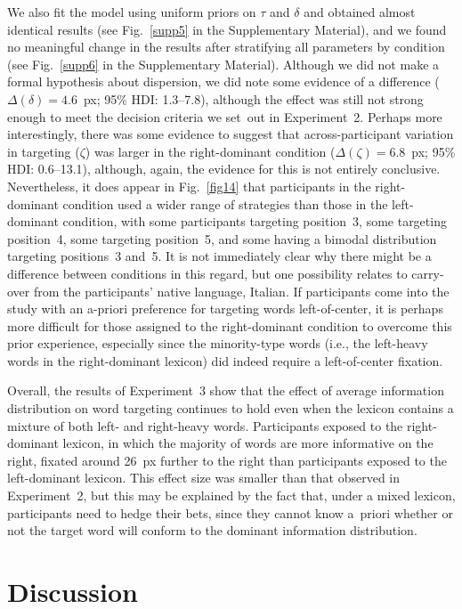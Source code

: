 \documentclass[doc,biblatex,floatsintext]{apa7}
\begin{document}
We also fit the model using uniform priors on $\tau$ and $\delta$ and obtained almost identical results (see Fig.~\ref{supp5} in the Supplementary Material), and we found no meaningful change in the results after stratifying all parameters by condition (see Fig.~\ref{supp6} in the Supplementary Material). Although we did not make a formal hypothesis about dispersion, we did note some evidence of a difference ($\Delta(\delta) = 4.6$~px; 95\% HDI: 1.3--7.8), although the effect was still not strong enough to meet the decision criteria we set~out in Experiment~2. Perhaps more interestingly, there was some evidence to suggest that across-participant variation in targeting ($\zeta$) was larger in the right-dominant condition ($\Delta(\zeta) = 6.8$~px; 95\% HDI: 0.6--13.1), although, again, the evidence for this is not entirely conclusive. Nevertheless, it does appear in Fig.~\ref{fig14} that participants in the right-dominant condition used a wider range of strategies than those in the left-dominant condition, with some participants targeting position~3, some targeting position~4, some targeting position~5, and some having a bimodal distribution targeting positions~3 and~5. It is not immediately clear why there might be a difference between conditions in this regard, but one possibility relates to carry-over from the participants' native language, Italian. If participants come into the study with an a-priori preference for targeting words left-of-center, it is perhaps more difficult for those assigned to the right-dominant condition to overcome this prior experience, especially since the minority-type words (i.e., the left-heavy words in the right-dominant lexicon) did indeed require a left-of-center fixation.

Overall, the results of Experiment~3 show that the effect of average information distribution on word targeting continues to hold even when the lexicon contains a mixture of both left- and right-heavy words. Participants exposed to the right-dominant lexicon, in which the majority of words are more informative on the right, fixated around 26~px further to the right than participants exposed to the left-dominant lexicon. This effect size was smaller than that observed in Experiment~2, but this may be explained by the fact that, under a mixed lexicon, participants need to hedge their bets, since they cannot know a~priori whether or not the target word will conform to the dominant information distribution.

\section{Discussion}
\end{document}
